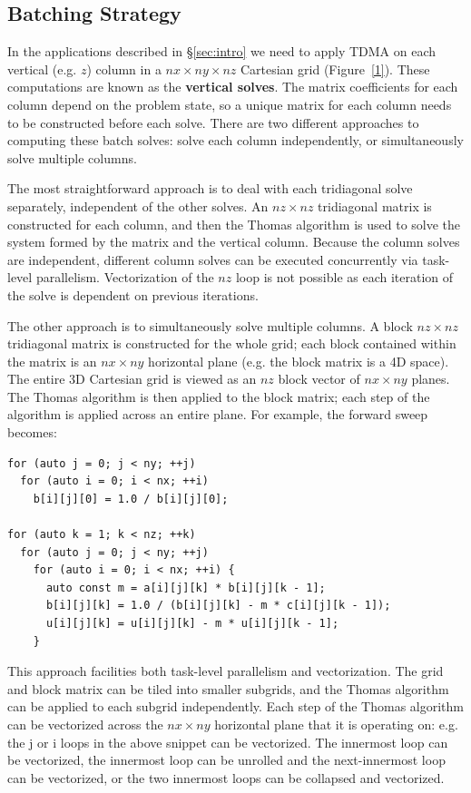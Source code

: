 \documentclass[conference]{IEEEtran}
\begin{document}
\subsection{Batching Strategy}

In the applications described in \S\ref{sec:intro} we need to apply TDMA
on each vertical
(e.g. $z$) column in a $nx \times ny \times nz$ Cartesian grid (Figure~\ref{1}).
These computations are known as the \textbf{vertical solves}. The matrix
coefficients for each column depend on the problem state, so a unique matrix
for each column needs to be constructed before each solve. There are two
different approaches to computing these batch solves: solve each column
independently, or simultaneously solve multiple columns.

The most straightforward approach is to deal with each tridiagonal solve
separately, independent of the other solves. An $nz\times nz$ tridiagonal
matrix is constructed for each column, and then the Thomas algorithm is used to
solve the system formed by the matrix and the vertical column. Because the
column solves are independent, different column solves can be executed
concurrently via task-level parallelism. Vectorization of the $nz$ loop is
not possible as each iteration of the solve is dependent on previous iterations.

The other approach is to simultaneously solve multiple columns. A block
$nz \times nz$ tridiagonal matrix is constructed for the whole grid; each block
contained within the matrix is an $nx \times ny$ horizontal plane (e.g. the
block matrix is a 4D space). The entire 3D Cartesian grid is viewed as an
$nz$ block vector of $nx \times ny$ planes. The Thomas algorithm is then
applied to the block matrix; each step of the algorithm is applied across an
entire plane. For example, the forward sweep becomes:

\begin{lstlisting}
for (auto j = 0; j < ny; ++j)
  for (auto i = 0; i < nx; ++i) 
    b[i][j][0] = 1.0 / b[i][j][0];

for (auto k = 1; k < nz; ++k)
  for (auto j = 0; j < ny; ++j)
    for (auto i = 0; i < nx; ++i) {
      auto const m = a[i][j][k] * b[i][j][k - 1];
      b[i][j][k] = 1.0 / (b[i][j][k] - m * c[i][j][k - 1]);
      u[i][j][k] = u[i][j][k] - m * u[i][j][k - 1];
    } 
\end{lstlisting}

This approach facilities both task-level parallelism and vectorization. The
grid and block matrix can be tiled into smaller subgrids, and the Thomas
algorithm can be applied to each subgrid independently. Each step of the Thomas
algorithm can be vectorized across the $nx \times ny$ horizontal plane that it
is operating on: e.g. the j or i loops in the above snippet can be vectorized.
The innermost loop can be vectorized, the innermost loop can be unrolled and
the next-innermost loop can be vectorized, or the two innermost loops can be
collapsed and vectorized.
\end{document}
